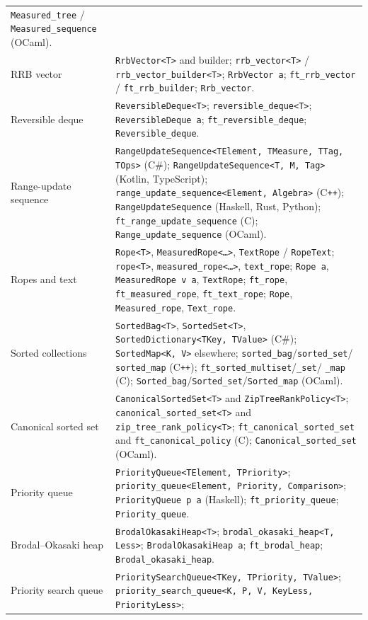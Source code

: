 \documentclass[11pt,twoside,openright]{book}
\makeatletter
\newcommand{\code}[1]{\texorpdfstring{\textcolor{d7ink}{\texttt{#1}}}{#1}}
\newenvironment{d7table}[1]
  {\par\vspace{3pt}\small
   \setlength{\LTpre}{4pt}\setlength{\LTpost}{4pt}
   \begin{longtable}{@{}%
     >{\raggedright\arraybackslash}p{#1\textwidth}%
     @{\hspace{10pt}}%
     >{\raggedright\arraybackslash}p{\dimexpr\textwidth-#1\textwidth-10pt\relax}@{}}}
  {\end{longtable}}
\makeatother
\begin{document}
\begin{d7table}{0.26}
\code{Measured\_tree} / \code{Measured\_sequence} (OCaml). \\
RRB vector &
\code{RrbVector<T>} and builder; \code{rrb\_vector<T>} /
\code{rrb\_vector\_builder<T>}; \code{RrbVector a};
\code{ft\_rrb\_vector} / \code{ft\_rrb\_builder}; \code{Rrb\_vector}. \\
Reversible deque &
\code{ReversibleDeque<T>}; \code{reversible\_deque<T>};
\code{ReversibleDeque a}; \code{ft\_reversible\_deque}; \code{Reversible\_deque}. \\
Range-update sequence &
\code{RangeUpdateSequence<TElement, TMeasure, TTag, TOps>} (C\#);
\code{RangeUpdateSequence<T, M, Tag>} (Kotlin, TypeScript);
\code{range\_update\_sequence<Element, Algebra>} (C\texttt{++});
\code{RangeUpdateSequence} (Haskell, Rust, Python);
\code{ft\_range\_update\_sequence} (C); \code{Range\_update\_sequence} (OCaml). \\
Ropes and text &
\code{Rope<T>}, \code{MeasuredRope<\ldots>}, \code{TextRope} / \code{RopeText};
\code{rope<T>}, \code{measured\_rope<\ldots>}, \code{text\_rope};
\code{Rope a}, \code{MeasuredRope v a}, \code{TextRope};
\code{ft\_rope}, \code{ft\_measured\_rope}, \code{ft\_text\_rope};
\code{Rope}, \code{Measured\_rope}, \code{Text\_rope}. \\
Sorted collections &
\code{SortedBag<T>}, \code{SortedSet<T>}, \code{SortedDictionary<TKey, TValue>}
(C\#); \code{SortedMap<K, V>} elsewhere; \code{sorted\_bag}/\code{sorted\_set}/
\code{sorted\_map} (C\texttt{++}); \code{ft\_sorted\_multiset}/\code{\_set}/
\code{\_map} (C); \code{Sorted\_bag}/\code{Sorted\_set}/\code{Sorted\_map}
(OCaml). \\
Canonical sorted set &
\code{CanonicalSortedSet<T>} and \code{ZipTreeRankPolicy<T>};
\code{canonical\_sorted\_set<T>} and \code{zip\_tree\_rank\_policy<T>};
\code{ft\_canonical\_sorted\_set} and \code{ft\_canonical\_policy} (C);
\code{Canonical\_sorted\_set} (OCaml). \\
Priority queue &
\code{PriorityQueue<TElement, TPriority>};
\code{priority\_queue<Element, Priority, Comparison>};
\code{PriorityQueue p a} (Haskell); \code{ft\_priority\_queue};
\code{Priority\_queue}. \\
Brodal--Okasaki heap &
\code{BrodalOkasakiHeap<T>}; \code{brodal\_okasaki\_heap<T, Less>};
\code{BrodalOkasakiHeap a}; \code{ft\_brodal\_heap};
\code{Brodal\_okasaki\_heap}. \\
Priority search queue &
\code{PrioritySearchQueue<TKey, TPriority, TValue>};
\code{priority\_search\_queue<K, P, V, KeyLess, PriorityLess>};

\end{d7table}
\end{document}
